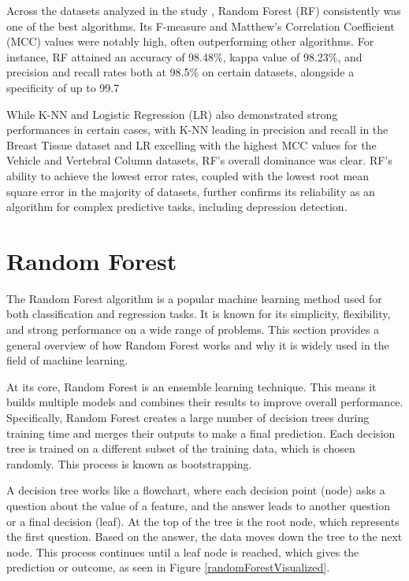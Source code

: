 Across the datasets analyzed in the study \cite{siraj2023performanceModelComparison}, Random Forest (RF) consistently was one of the best algorithms. Its F-measure and Matthew's Correlation Coefficient (MCC) values were notably high, often outperforming other algorithms. For instance, RF attained an accuracy of 98.48\%, kappa value of 98.23\%, and precision and recall rates both at 98.5\% on certain datasets, alongside a specificity of up to 99.7%

While K-NN and Logistic Regression (LR) also demonstrated strong performances in certain cases, with K-NN leading in precision and recall in the Breast Tissue dataset and LR excelling with the highest MCC values for the Vehicle and Vertebral Column datasets, RF's overall dominance was clear. RF's ability to achieve the lowest error rates, coupled with the lowest root mean square error in the majority of datasets, further confirms its reliability as an algorithm for complex predictive tasks, including depression detection.

\section{Random Forest}

\quad The Random Forest algorithm is a popular machine learning method used for both classification and regression tasks. It is known for its simplicity, flexibility, and strong performance on a wide range of problems. This section provides a general overview of how Random Forest works and why it is widely used in the field of machine learning.

At its core, Random Forest is an ensemble learning technique. This means it builds multiple models and combines their results to improve overall performance. Specifically, Random Forest creates a large number of decision trees during training time and merges their outputs to make a final prediction. Each decision tree is trained on a different subset of the training data, which is chosen randomly. This process is known as bootstrapping.

A decision tree works like a flowchart, where each decision point (node) asks a question about the value of a feature, and the answer leads to another question or a final decision (leaf). At the top of the tree is the root node, which represents the first question. Based on the answer, the data moves down the tree to the next node. This process continues until a leaf node is reached, which gives the prediction or outcome, as seen in Figure \ref{randomForestVisualized}.

